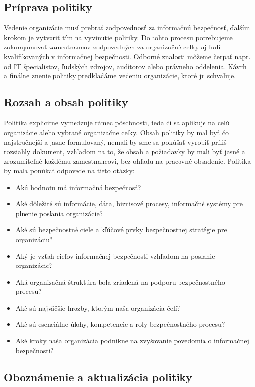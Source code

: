 \subsection*{Príprava politiky}
 
Vedenie organizácie musí prebrať zodpovednosť za informačnú bezpečnosť, ďalším krokom je vytvoriť tím na vyvinutie politiky. Do tohto procesu
potrebujeme zakomponovať zamestnancov zodpovedných za organizačné celky aj ľudí kvalifikovaných v informačnej bezpečnosti. Odborné znalosti
môžeme čerpať napr. od IT špecialistov, ľudských zdrojov, audítorov alebo právneho oddelenia. Návrh a finálne znenie politiky predkladáme
vedeniu organizácie, ktoré ju schvaľuje.

\subsection*{Rozsah a obsah politiky}

Politika explicitne vymedzuje rámec pôsobností, teda či sa aplikuje na celú organizácie alebo vybrané organizačne celky. Obsah politiky
by mal byť čo najstručnejší a jasne formulovaný, nemali by sme sa pokúšať vyrobiť príliš rozsiahly dokument, vzhľadom na to, že obsah
a požiadavky by mali byť jasné a zrozumiteľné každému zamestnancovi, bez ohľadu na pracovné obsadenie. Politika by mala ponúkať
odpovede na tieto otázky:
\begin{itemize}[nosep]
        \item Akú hodnotu má informačná bezpečnosť?
        \item Aké dôležité sú informácie, dáta, biznisové procesy, informačné systémy pre plnenie poslania organizácie?
        \item Aké sú bezpečnostné ciele a kľúčové prvky bezpečnostnej stratégie pre organizáciu?
        \item Aký je vzťah cieľov informačnej bezpečnosti vzhľadom na poslanie organizácie?
        \item Aká organizačná štruktúra bola zriadená na podporu bezpečnostného procesu?
        \item Aké sú najväčšie hrozby, ktorým naša organizácia čelí?
        \item Aké sú esenciálne úlohy, kompetencie a roly bezpečnostného procesu?
        \item Aké kroky naša organizácia podnikne na zvyšovanie povedomia o informačnej bezpečnosti?
\end{itemize}

\subsection*{Oboznámenie a aktualizácia politiky}


